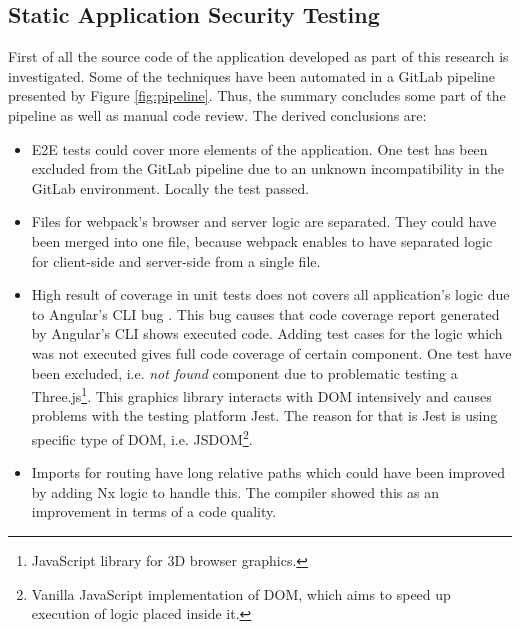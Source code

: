\documentclass{article} %
\begin{document}
\subsection{Static Application Security Testing}
First of all the source code of the application developed as part of this research is investigated. Some of the techniques have been automated in a GitLab pipeline presented by Figure \ref{fig:pipeline}. Thus, the summary concludes some part of the pipeline as well as manual code review. The derived conclusions are:
\begin{itemize}
    \item E2E tests could cover more elements of the application. One test has been excluded from the GitLab pipeline due to an unknown incompatibility in the GitLab environment. Locally the test passed.
    \item Files for webpack's browser and server logic are separated. They could have been merged into one file, because webpack enables to have separated logic for client-side and server-side from a single file.
    \item High result of coverage in unit tests does not covers all application's logic due to Angular's CLI bug \cite{bib:angular_coverage}. This bug causes that code coverage report generated by Angular's CLI shows executed code. Adding test cases for the logic which was not executed gives full code coverage of certain component. One test have been excluded, i.e. \textit{not found} component due to problematic testing a Three.js\footnote{JavaScript library for 3D browser graphics.}. This graphics library interacts with DOM intensively and causes problems with the testing platform Jest. The reason for that is Jest is using specific type of DOM, i.e. JSDOM\footnote{Vanilla JavaScript implementation of DOM, which aims to speed up execution of logic placed inside it.}.
    \item Imports for routing have long relative paths which could have been improved by adding Nx logic to handle this. The compiler showed this as an improvement in terms of a code quality.

\end{itemize}
\end{document}
